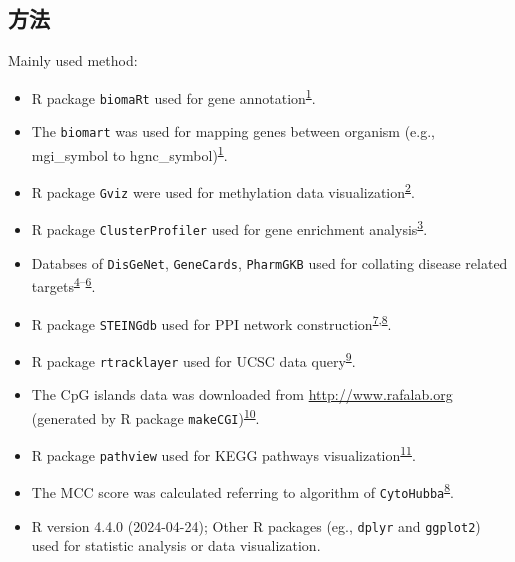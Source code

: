 \documentclass[
]{article}
\providecommand{\tightlist}{%
  \setlength{\itemsep}{0pt}\setlength{\parskip}{0pt}}
\begin{document}
\hypertarget{ux65b9ux6cd5}{%
\subsection{方法}\label{ux65b9ux6cd5}}

Mainly used method:

\begin{itemize}
\tightlist
\item
  R package \texttt{biomaRt} used for gene annotation\textsuperscript{\protect\hyperlink{ref-MappingIdentifDurinc2009}{1}}.
\item
  The \texttt{biomart} was used for mapping genes between organism (e.g., mgi\_symbol to hgnc\_symbol)\textsuperscript{\protect\hyperlink{ref-MappingIdentifDurinc2009}{1}}.
\item
  R package \texttt{Gviz} were used for methylation data visualization\textsuperscript{\protect\hyperlink{ref-VisualizingGenHahne2016}{2}}.
\item
  R package \texttt{ClusterProfiler} used for gene enrichment analysis\textsuperscript{\protect\hyperlink{ref-ClusterprofilerWuTi2021}{3}}.
\item
  Databses of \texttt{DisGeNet}, \texttt{GeneCards}, \texttt{PharmGKB} used for collating disease related targets\textsuperscript{\protect\hyperlink{ref-TheDisgenetKnPinero2019}{4}--\protect\hyperlink{ref-PharmgkbAWorBarbar2018}{6}}.
\item
  R package \texttt{STEINGdb} used for PPI network construction\textsuperscript{\protect\hyperlink{ref-TheStringDataSzklar2021}{7},\protect\hyperlink{ref-CytohubbaIdenChin2014}{8}}.
\item
  R package \texttt{rtracklayer} used for UCSC data query\textsuperscript{\protect\hyperlink{ref-RtracklayerAnLawren2009}{9}}.
\item
  The CpG islands data was downloaded from \url{http://www.rafalab.org} (generated by R package \texttt{makeCGI})\textsuperscript{\protect\hyperlink{ref-RedefiningCpgWuHa2010}{10}}.
\item
  R package \texttt{pathview} used for KEGG pathways visualization\textsuperscript{\protect\hyperlink{ref-PathviewAnRLuoW2013}{11}}.
\item
  The MCC score was calculated referring to algorithm of \texttt{CytoHubba}\textsuperscript{\protect\hyperlink{ref-CytohubbaIdenChin2014}{8}}.
\item
  R version 4.4.0 (2024-04-24); Other R packages (eg., \texttt{dplyr} and \texttt{ggplot2}) used for statistic analysis or data visualization.
\end{itemize}
\end{document}
